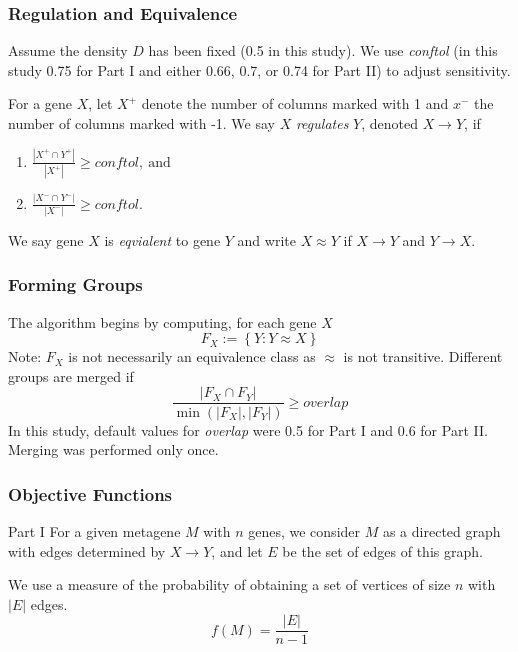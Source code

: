 \documentclass[
	11pt, %
]{beamer}
\begin{document}
\begin{frame}
	\frametitle{Regulation and Equivalence}
    
    Assume the density $D$ has been fixed (0.5 in this study). We use \emph{conftol} (in this study 0.75 for Part I and either 0.66, 0.7, or 0.74 for Part II) to adjust sensitivity.
    
    \bigskip
    \pause
    \begin{definition}
        For a gene $X$, let $X^{+}$ denote the number of columns marked with 1 and $x^{-}$ the number of columns marked with -1. We say $X$ \emph{regulates} $Y$, denoted $X \rightarrow Y$, if
        \begin{enumerate}
            \item $\frac{\left| X^{+} \cap Y^{+} \right|}{\left| X^{+} \right|} \geq conftol,\ \mathrm{and}$
            \item $\frac{\left| X^{-} \cap Y^{-} \right|}{\left| X^{-} \right|} \geq conftol.$
        \end{enumerate}
    \end{definition}
    \pause
    \begin{definition}
        We say gene $X$ is \emph{eqvialent} to gene $Y$ and write $X \approx Y$ if $X \rightarrow Y$ and $Y \rightarrow X$.
    \end{definition}
\end{frame}

\begin{frame}
	\frametitle{Forming Groups}

    The algorithm begins by computing, for each gene $X$
    \begin{equation*}
        F_X := \left\{ Y : Y \approx X \right\}
    \end{equation*}
    \pause
    Note: $F_X$ is not necessarily an equivalence class as $\approx$ is not transitive. Different groups are merged if
    \begin{equation*}
        \frac{\left| F_X \cap F_Y \right|}{\min(\left| F_X \right|, \left| F_Y \right|)} \geq overlap
    \end{equation*}
    \pause
    In this study, default values for \emph{overlap} were 0.5 for Part I and 0.6 for Part II. Merging was performed only once.
\end{frame}

\begin{frame}
    \frametitle{Objective Functions}
    \begin{block}{Part I}
        For a given metagene $M$ with $n$ genes, we consider $M$ as a directed graph with edges determined by $X \rightarrow Y$, and let $E$ be the set of edges of this graph.
        \smallskip
        
        \pause
        We use a measure of the probability of obtaining a set of vertices of size $n$ with $\left| E \right|$ edges.
        \begin{equation*}
            f(M) = \frac{\left| E \right|}{n-1}
        \end{equation*}
    \end{block}
\end{frame}
\end{document}
